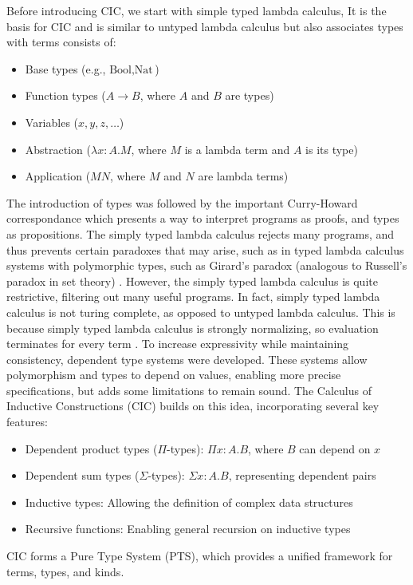 Before introducing CIC, we start with simple typed lambda calculus,
It is the basis for CIC and is similar to untyped lambda calculus but also associates types with terms consists of:
\begin{itemize}
\item Base types (e.g., $\text{Bool}, \text{Nat}$)
\item Function types ($A \to B$, where $A$ and $B$ are types)
\item Variables ($x, y, z, \ldots$)
\item Abstraction ($\lambda x:A. M$, where $M$ is a lambda term and $A$ is its type)
\item Application ($M N$, where $M$ and $N$ are lambda terms)
\end{itemize}
The introduction of types was followed by the important Curry-Howard correspondance which presents a way to interpret programs as proofs, and types as propositions.
The simply typed lambda calculus rejects many programs, and thus prevents certain paradoxes that may arise, such as in typed lambda calculus systems with polymorphic types, such as Girard's paradox (analogous to Russell's paradox in set theory) \cite{hurkens1995simplificationgirardparadox}.
However, the simply typed lambda calculus is quite restrictive, filtering out many useful programs.
In fact, simply typed lambda calculus is not turing complete, as opposed to untyped lambda calculus.
This is because simply typed lambda calculus is strongly normalizing, so evaluation terminates for every term \cite{loh2010tutorialdependentlytyped}.
To increase expressivity while maintaining consistency, dependent type systems were developed.
These systems allow polymorphism and types to depend on values, enabling more precise specifications, but adds some limitations to remain sound.
The Calculus of Inductive Constructions (CIC) builds on this idea, incorporating several key features:
\begin{itemize}
\item Dependent product types ($\Pi$-types): $\Pi x:A. B$, where $B$ can depend on $x$
\item Dependent sum types ($\Sigma$-types): $\Sigma x:A. B$, representing dependent pairs
\item Inductive types: Allowing the definition of complex data structures
\item Recursive functions: Enabling general recursion on inductive types
\end{itemize}
CIC forms a Pure Type System (PTS), which provides a unified framework for terms, types, and kinds. 

